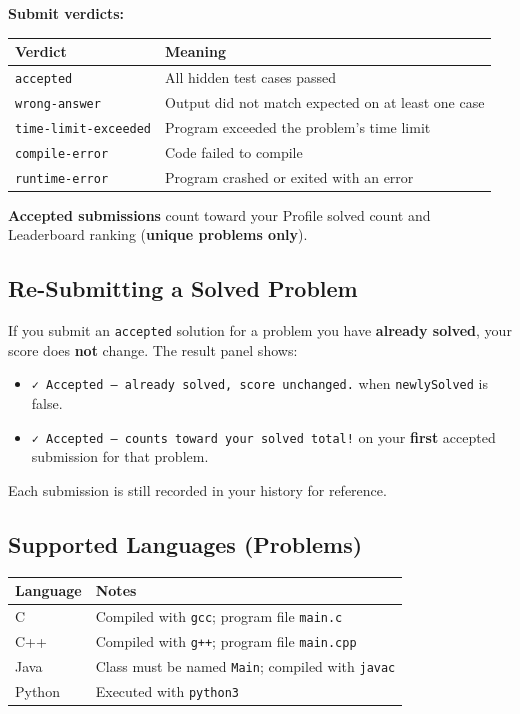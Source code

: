 \documentclass[11pt,a4paper]{article}
\begin{document}
\textbf{Submit verdicts:}
\begin{table}[h]
\centering
\small
\begin{tabular}{@{}lp{8cm}@{}}
\toprule
\textbf{Verdict} & \textbf{Meaning} \\
\midrule
\texttt{accepted}              & All hidden test cases passed \\
\texttt{wrong-answer}          & Output did not match expected on at least one case \\
\texttt{time-limit-exceeded}   & Program exceeded the problem's time limit \\
\texttt{compile-error}         & Code failed to compile \\
\texttt{runtime-error}         & Program crashed or exited with an error \\
\bottomrule
\end{tabular}
\end{table}

\textbf{Accepted submissions} count toward your Profile solved count and Leaderboard ranking (\textbf{unique problems only}).

\subsection{Re-Submitting a Solved Problem}
If you submit an \texttt{accepted} solution for a problem you have \textbf{already solved}, your score does \textbf{not} change. The result panel shows:

\begin{itemize}[noitemsep]
  \item \texttt{✓ Accepted --- already solved, score unchanged.} when \texttt{newlySolved} is false.
  \item \texttt{✓ Accepted --- counts toward your solved total!} on your \textbf{first} accepted submission for that problem.
\end{itemize}

Each submission is still recorded in your history for reference.

\subsection{Supported Languages (Problems)}
\begin{table}[h]
\centering
\begin{tabular}{@{}ll@{}}
\toprule
\textbf{Language} & \textbf{Notes} \\
\midrule
C      & Compiled with \texttt{gcc}; program file \texttt{main.c} \\
C++    & Compiled with \texttt{g++}; program file \texttt{main.cpp} \\
Java   & Class must be named \texttt{Main}; compiled with \texttt{javac} \\
Python & Executed with \texttt{python3} \\
\bottomrule
\end{tabular}
\end{table}
\end{document}
